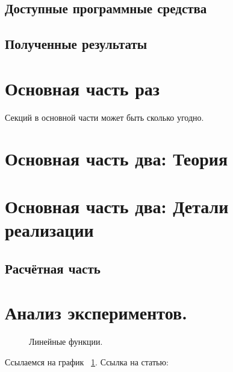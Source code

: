 \documentclass[aps,%
12pt,%
final,%
oneside,
onecolumn,%
musixtex, %
superscriptaddress,%
centertags]{article} %
\begin{document}
\subsection{Доступные программные средства}
\subsection{Полученные результаты}

\section{Основная часть раз}
Секций в основной части может быть сколько угодно.

\section{Основная часть два: Теория}

\section{Основная часть два: Детали реализации}
\subsection{Расчётная часть}

\section{Анализ экспериментов.}
\begin{figure}[ht]
\begin{center}


\caption{
\label{graph-fig}
     Линейные функции.}
\end {center}
\end {figure}
Ссылаемся на график ~\ref{graph-fig}.
Ссылка на статью: \cite{DBLP:conf/adbis/NovikovP03}
\end{document}
